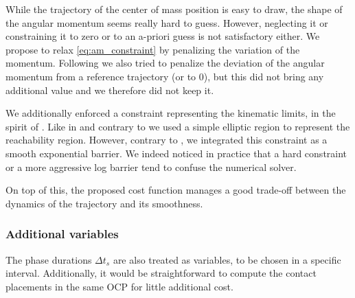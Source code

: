 While the trajectory of the center of mass position is easy to draw, the shape of the angular momentum seems really hard to guess. However, neglecting it \cite{kudruss_ichr15} or constraining it to zero \cite{perrin_isrr15} or to an a-priori guess \cite{rotella_humanoid15} is not satisfactory either. We propose to relax \eqref{eq:am_constraint} by penalizing the variation of the momentum. Following \cite{rotella_humanoid15} we also tried to penalize the deviation of the angular momentum from a reference trajectory (or to 0), but this did not bring any additional value and we therefore did not keep it.

We additionally enforced a constraint representing the kinematic limits, in the spirit of \cite{mordatch:tog:12,kudruss_ichr15}. Like in \cite{kudruss_ichr15} and contrary to \cite{mordatch:tog:12} we used a simple elliptic region to represent the reachability region. However, contrary to \cite{kudruss_ichr15}, we integrated this constraint as a smooth exponential barrier. We indeed noticed in practice that a hard constraint or a more aggressive log barrier tend to confuse the numerical solver.

On top of this, the proposed cost function manages a good trade-off between the dynamics of the trajectory and its smoothness. 

\subsubsection{Additional variables}
The phase durations $\Delta t_s$ are also treated as variables, to be chosen in a specific interval. Additionally, it would be straightforward to compute the contact placements in the same OCP for little additional cost.




